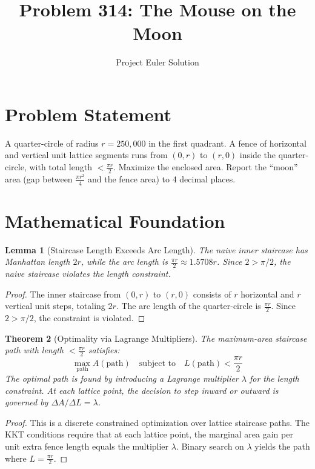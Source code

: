 \documentclass[12pt]{article}
\title{Problem 314: The Mouse on the Moon}
\author{Project Euler Solution}
\date{}
\newtheorem{theorem}{Theorem}
\newtheorem{lemma}[theorem]{Lemma}
\begin{document}
\maketitle

\section{Problem Statement}

A quarter-circle of radius $r = 250{,}000$ in the first quadrant. A fence of horizontal and vertical unit lattice segments runs from $(0,r)$ to $(r,0)$ inside the quarter-circle, with total length $< \frac{\pi r}{2}$. Maximize the enclosed area. Report the ``moon'' area (gap between $\frac{\pi r^2}{4}$ and the fence area) to 4 decimal places.

\section{Mathematical Foundation}

\begin{lemma}[Staircase Length Exceeds Arc Length]
The naive inner staircase has Manhattan length $2r$, while the arc length is $\frac{\pi r}{2} \approx 1.5708r$. Since $2 > \pi/2$, the naive staircase violates the length constraint.
\end{lemma}

\begin{proof}
The inner staircase from $(0,r)$ to $(r,0)$ consists of $r$ horizontal and $r$ vertical unit steps, totaling $2r$. The arc length of the quarter-circle is $\frac{\pi r}{2}$. Since $2 > \pi/2$, the constraint is violated.
\end{proof}

\begin{theorem}[Optimality via Lagrange Multipliers]
The maximum-area staircase path with length $< \frac{\pi r}{2}$ satisfies:
\[
    \max_{\text{path}} A(\text{path}) \quad \text{subject to} \quad L(\text{path}) < \frac{\pi r}{2}
\]
The optimal path is found by introducing a Lagrange multiplier $\lambda$ for the length constraint. At each lattice point, the decision to step inward or outward is governed by $\Delta A / \Delta L = \lambda$.
\end{theorem}

\begin{proof}
This is a discrete constrained optimization over lattice staircase paths. The KKT conditions require that at each lattice point, the marginal area gain per unit extra fence length equals the multiplier $\lambda$. Binary search on $\lambda$ yields the path where $L = \frac{\pi r}{2}$.
\end{proof}
\end{document}

